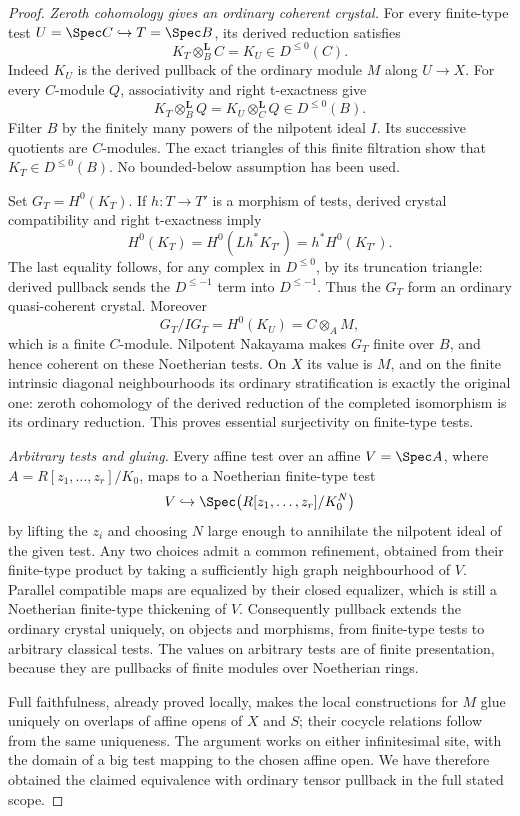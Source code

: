 \begin{proof}
\emph{Zeroth cohomology gives an ordinary coherent crystal.}
For every finite-type test $U=\Spec C\hookrightarrow T=\Spec B$, its derived reduction satisfies
\[
 K_T\otimes_B^{\mathbf L}C=K_U\in D^{\leq0}(C).
\]
Indeed $K_U$ is the derived pullback of the ordinary module $M$ along $U\to X$.  For every $C$-module $Q$, associativity and right t-exactness give
\[
                   K_T\otimes_B^{\mathbf L}Q
                   =K_U\otimes_C^{\mathbf L}Q\in D^{\leq0}(B).
\]
Filter $B$ by the finitely many powers of the nilpotent ideal $I$.  Its successive quotients are $C$-modules.  The exact triangles of this finite filtration show that $K_T\in D^{\leq0}(B)$.  No bounded-below assumption has been used.

Set $G_T=H^0(K_T)$.  If $h:T\to T'$ is a morphism of tests, derived crystal compatibility and right t-exactness imply
\[
 H^0(K_T)=H^0(Lh^*K_{T'})=h^*H^0(K_{T'}).
\]
The last equality follows, for any complex in $D^{\leq0}$, by its truncation triangle: derived pullback sends the $D^{\leq-1}$ term into $D^{\leq-1}$.  Thus the $G_T$ form an ordinary quasi-coherent crystal.  Moreover
\[
          G_T/IG_T=H^0(K_U)=C\otimes_AM,
\]
which is a finite $C$-module.  Nilpotent Nakayama makes $G_T$ finite over $B$, and hence coherent on these Noetherian tests.  On $X$ its value is $M$, and on the finite intrinsic diagonal neighbourhoods its ordinary stratification is exactly the original one: zeroth cohomology of the derived reduction of the completed isomorphism is its ordinary reduction.  This proves essential surjectivity on finite-type tests.

\emph{Arbitrary tests and gluing.}
Every affine test over an affine $V=\Spec A$, where $A=R[z_1,\ldots,z_r]/K_0$, maps to a Noetherian finite-type test
\[
        V\hookrightarrow\Spec\bigl(R[z_1,\ldots,z_r]/K_0^N\bigr)
\]
by lifting the $z_i$ and choosing $N$ large enough to annihilate the nilpotent ideal of the given test.  Any two choices admit a common refinement, obtained from their finite-type product by taking a sufficiently high graph neighbourhood of $V$.  Parallel compatible maps are equalized by their closed equalizer, which is still a Noetherian finite-type thickening of $V$.  Consequently pullback extends the ordinary crystal uniquely, on objects and morphisms, from finite-type tests to arbitrary classical tests.  The values on arbitrary tests are of finite presentation, because they are pullbacks of finite modules over Noetherian rings.

Full faithfulness, already proved locally, makes the local constructions for $M$ glue uniquely on overlaps of affine opens of $X$ and $S$; their cocycle relations follow from the same uniqueness.  The argument works on either infinitesimal site, with the domain of a big test mapping to the chosen affine open.  We have therefore obtained the claimed equivalence with ordinary tensor pullback in the full stated scope.
\end{proof}

